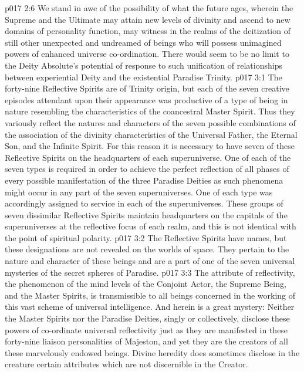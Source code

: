 \vs p017 2:6 We stand in awe of the possibility of what the future ages, wherein the Supreme and the Ultimate may attain new levels of divinity and ascend to new domains of personality function, may witness in the realms of the deitization of still other unexpected and undreamed of beings who will possess unimagined powers of enhanced universe co\hyp{}ordination. There would seem to be no limit to the Deity Absolute’s potential of response to such unification of relationships between experiential Deity and the existential Paradise Trinity.
\vs p017 3:1 The forty\hyp{}nine Reflective Spirits are of Trinity origin, but each of the seven creative episodes attendant upon their appearance was productive of a type of being in nature resembling the characteristics of the coancestral Master Spirit. Thus they variously reflect the natures and characters of the seven possible combinations of the association of the divinity characteristics of the Universal Father, the Eternal Son, and the Infinite Spirit. For this reason it is necessary to have seven of these Reflective Spirits on the headquarters of each superuniverse. One of each of the seven types is required in order to achieve the perfect reflection of all phases of every possible manifestation of the three Paradise Deities as such phenomena might occur in any part of the seven superuniverses. One of each type was accordingly assigned to service in each of the superuniverses. These groups of seven dissimilar Reflective Spirits maintain headquarters on the capitals of the superuniverses at the reflective focus of each realm, and this is not identical with the point of spiritual polarity.
\vs p017 3:2 The Reflective Spirits have names, but these designations are not revealed on the worlds of space. They pertain to the nature and character of these beings and are a part of one of the seven universal mysteries of the secret spheres of Paradise.
\vs p017 3:3 The attribute of reflectivity, the phenomenon of the mind levels of the Conjoint Actor, the Supreme Being, and the Master Spirits, is transmissible to all beings concerned in the working of this vast scheme of universal intelligence. And herein is a great mystery: Neither the Master Spirits nor the Paradise Deities, singly or collectively, disclose these powers of co\hyp{}ordinate universal reflectivity just as they are manifested in these forty\hyp{}nine liaison personalities of Majeston, and yet they are the creators of all these marvelously endowed beings. Divine heredity does sometimes disclose in the creature certain attributes which are not discernible in the Creator.
